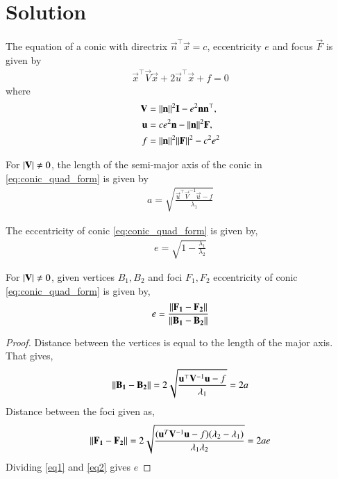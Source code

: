 \documentclass[journal,12pt,twocolumn]{IEEEtran}
\begin{document}
\section{Solution}
\begin{lemma}
The equation of  a conic with directrix $\vec{n}^{\top}\vec{x} = c$, eccentricity $e$ and focus $\vec{F}$ is given by 
\begin{align}
    \label{eq:conic_quad_form}
    \vec{x}^{\top}\vec{V}\vec{x}+2\vec{u}^{\top}\vec{x}+f=0
\end{align}
where     
\begin{align}
    \label{eq:conic_quad_form_v}
    \mathbf{V} &=\lVert\mathbf{n}\rVert^2\mathbf{I}-e^2\mathbf{n}\mathbf{n}^{\top}, \\
    \label{eq:conic_quad_form_u}
    \mathbf{u} &= ce^2\mathbf{n}-\lVert\mathbf{n}\rVert^2\mathbf{F}, \\
    \label{eq:conic_quad_form_f}
    f &= \lVert\mathbf{n}\rVert^2\lVert\mathbf{F}\rVert^2-c^2e^2
\end{align}
\end{lemma}
\begin{lemma}
    For $\vert\mathbf{V}\vert \ne 0$, the length of the semi-major axis of the conic in \eqref{eq:conic_quad_form} is given by 
    \begin{align} 
        a = \sqrt{\frac{\vec{u}^{\top}\vec{V}^{-1}\vec{u} -f}{\lambda_1}}
        \label{eq:ab}
    \end{align}
\end{lemma}
\begin{lemma}
The eccentricity of conic \eqref{eq:conic_quad_form} is given by,
\begin{align}
    \label{eq:eccentricity} e = \sqrt{1 - \frac{\lambda_1}{\lambda_2}}
\end{align}
\end{lemma}
\begin{lemma}
For $\vert\mathbf{V}\vert \ne 0$, given vertices $B_1,B_2$ and foci $F_1,F_2$ eccentricity of conic \eqref{eq:conic_quad_form} is given by,
\begin{align}
    \label{eq:eccentricity} e = \frac{\lVert\mathbf{F_1}-\mathbf{F_2}\rVert}{\lVert\mathbf{B_1}-\mathbf{B_2}\rVert}
\end{align}
\end{lemma}
\begin{proof}
Distance between the vertices is equal to the length of the major axis. That gives,
\begin{align}
    \label{eq1} \lVert\mathbf{B_1}-\mathbf{B_2}\rVert = 2\sqrt{\frac{\mathbf{u}^{\top}\mathbf{V}^{-1}\mathbf{u} -f}{\lambda_1}} = 2a
\end{align}
Distance between the foci given as,
\begin{align}
    \label{eq2} \lVert\mathbf{F_1}-\mathbf{F_2}\rVert = 2\sqrt{\frac{(\mathbf{u}^T\mathbf{V}^{-1}\mathbf{u}-f)(\lambda_2-\lambda_1)}{\lambda_1\lambda_2}} = 2ae
\end{align}
Dividing \eqref{eq1} and \eqref{eq2} gives $e$
\end{proof}
\end{document}

